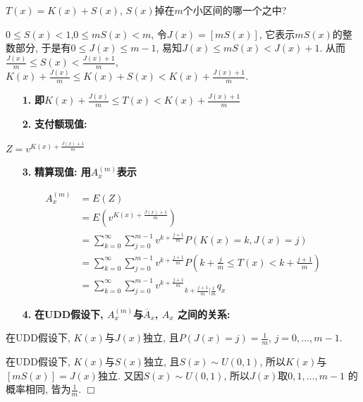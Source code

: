 \documentclass[a4paper,10pt]{ctexbook}
\newcommand{\hei}{\CJKfamily{hei}}      %
\def\qed{\hfill$\Box$\medskip}
\begin{document}
$T(x)=K(x)+S(x)$, $S(x)$掉在$m$个小区间的哪一个之中?

$0 \leq S(x)<1$,$0\leq mS(x)<m$, 令$J(x)=[mS(x)]$, 它表示$mS(x)$的整数部分, 于是有$0\leq J(x)\leq m-1$, 易知$J(x)\leq mS(x)<J(x)+1$. 从而$\frac{J(x)}{m}\leq S(x)<\frac{J(x)+1}{m}$, $K(x)+\frac{J(x)}{m}\leq K(x)+S(x)< K(x)+\frac{J(x)+1}{m}$.

\begin{itemize}
    \item[{\bf\hei 1.}]{\bf\hei 即$K(x)+\frac{J(x)}{m}\leq T(x)< K(x)+\frac{J(x)+1}{m}$}
\end{itemize}

\begin{itemize}
    \item[{\bf\hei 2.}]{\bf\hei 支付额现值: }
\end{itemize}

$Z=v^{K(x)+\frac{J(x)+1}{m}}$

\begin{itemize}
    \item[{\bf\hei 3.}]{\bf\hei 精算现值: 用$A_{x}^{(m)}$表示}
\end{itemize}
\begin{align*}
    A_{x}^{(m)} & =E(Z)                                                                                            \\
                & =E(v^{K(x)+\frac{J(x)+1}{m}})                                                                    \\
                & =\sum_{k=0}^{\infty}\sum_{j=0}^{m-1}v^{k+\frac{j+1}{m}}P(K(x)=k,J(x)=j)                          \\
                & =\sum_{k=0}^{\infty}\sum_{j=0}^{m-1}v^{k+\frac{j+1}{m}}P(k+\frac{j}{m}\leq T(x)<k+\frac{j+1}{m}) \\
                & =\sum_{k=0}^{\infty}\sum_{j=0}^{m-1}v^{k+\frac{j+1}{m}}{}_{k+\frac{j+1}{m}|\frac{1}{m}}q_{x}
\end{align*}
\begin{itemize}
    \item[{\bf\hei 4.}]{\bf\hei 在UDD假设下, $A_{x}^{(m)}$与$\overline A_{x}$, $A_{x}$ 之间的关系:}
\end{itemize}

\begin{proposition}
    在UDD假设下, $K(x)$与$J(x)$独立, 且$P(J(x)=j)=\frac{1}{m}$, $j=0, ..., m-1.$
\end{proposition}

\proof
在UDD假设下, $K(x)$与$S(x)$独立, 且$S(x)\sim U(0,1)$, 所以$K(x)$与$[mS(x)]=J(x)$独立. 又因$S(x)\sim U(0,1)$, 所以$J(x)$取$0, 1, \dots, m-1$ 的概率相同, 皆为$\frac{1}{m}$.
\qed
\end{document}
